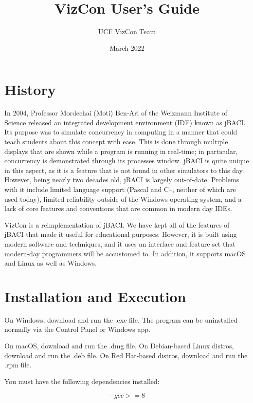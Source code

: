 \documentclass{article}
\title{VizCon User's Guide}
\author{UCF VizCon Team}
\date{March 2022}
\begin{document}
\maketitle

\section{History}
In 2004, Professor Mordechai (Moti) Ben-Ari of the Weizmann Institute of Science released an integrated development environment (IDE) known as jBACI. Its purpose was to simulate concurrency in computing in a manner that could teach students about this concept with ease. This is done through multiple displays that are shown while a program is running in real-time; in particular, concurrency is demonstrated through its processes window. jBACI is quite unique in this aspect, as it is a feature that is not found in other simulators to this day. However, being nearly two decades old, jBACI is largely out-of-date. Problems with it include limited language support (Pascal and C--, neither of which are used today), limited reliability outside of the Windows operating system, and a lack of core features and conventions that are common in modern day IDEs.


VizCon is a reimplementation of jBACI. We have kept all of the features of jBACI that made it useful for educational purposes. However, it is built using modern software and techniques, and it uses an interface and feature set that modern-day programmers will be accustomed to. In addition, it supports macOS and Linux as well as Windows.

\section{Installation and Execution}
On Windows, download and run the .exe file. The program can be uninstalled normally via the Control Panel or Windows app.

On macOS, download and run the .dmg file. On Debian-based Linux distros, download and run the .deb file. On Red Hat-based distros, download and run the .rpm file. 

You must have the following dependencies installed:

$$- gcc >= 8$$
\end{document}
